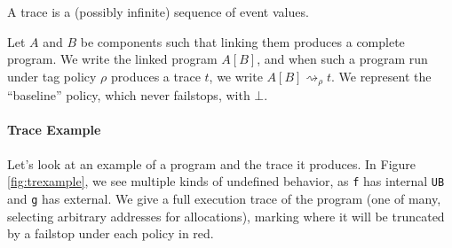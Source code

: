 \documentclass{article}
\begin{document}
A trace is a (possibly infinite) sequence of event values.

Let \(A\) and \(B\) be components such that linking them produces a complete program.
We write the linked program \(A[B]\), and when such a program run under tag
policy \(\rho\) produces a trace \(t\), we write \(A[B] \rightsquigarrow_\rho t\).
We represent the ``baseline'' policy, which never failstops, with \(\bot\).

\paragraph{Trace Example}

Let's look at an example of a program and the trace it produces. In Figure \ref{fig:trexample},
we see multiple kinds of undefined behavior, as {\tt f} has internal {\tt UB} and {\tt g} has
external. We give a full execution trace of the program (one of many, selecting arbitrary addresses
for allocations), marking where it will be truncated by a failstop under each policy in red.
\end{document}
